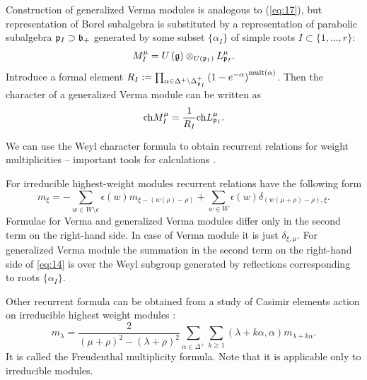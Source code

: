 Construction of generalized Verma modules is analogous to (\ref{eq:17}), but representation of Borel subalgebra is substituted by a representation of parabolic subalgebra $\mathfrak{p}_{I}\supset \mathfrak{b}_{+}$ generated by some subset $\{\alpha_{I}\}$ of simple roots $I\subset \{1,\dots, r\}$:
\begin{equation*}
M_{I}^{\mu}=U\left( \mathfrak{g}\right)\otimes _{U\left( \mathfrak{p}_{I}\right) }L_{\mathfrak{p}_{I}}^{\mu}.
\end{equation*}
Introduce a formal element $R_{I}:=\prod_{\alpha \in \Delta
^{+}\setminus \Delta _{\mathfrak{p}_{I}}^{+}}\left( 1-e^{-\alpha }\right)
^{\mathrm{mult}(\alpha )}$. Then the character of a generalized
Verma module can be written as
\begin{equation}
  \label{eq:18}
  \mathrm{ch}M_{I}^{\mu}=\frac{1}{R_{I}}\mathrm{ch}L_{\mathfrak{p}_{I}}^{\mu }.
\end{equation}



We can use the Weyl character formula to obtain recurrent relations for weight multiplicities -- important tools for calculations \cite{il2010folded,kulish4sfa}. 

For irreducible highest-weight modules recurrent relations have the following form
\begin{equation}
\label{eq:14}
m_{\xi }=-\sum_{w\in W\setminus e}\epsilon (w)m_{\xi
-\left( w(\rho )-\rho \right) }+\sum_{w\in W}\epsilon
(w)\delta _{\left( w(\mu +\rho )-\rho \right) ,\xi }.
\end{equation}
Formulae for Verma and generalized Verma modules differ only in the second term on the right-hand side. In case of Verma module it is just $\delta_{\xi,\mu}$. For generalized Verma module the summation in the second term on the right-hand side of \eqref{eq:14} is over the Weyl subgroup generated by reflections corresponding to roots $\{\alpha_{I}\}$.

Other recurrent formula can be obtained from a study of Casimir
elements action on irreducible highest weight modules
\cite{humphreys1997introduction}:
\begin{equation}
  \label{eq:15}
  m_{\lambda}=\frac{2}{(\mu+\rho)^{2}-(\lambda+\rho)^{2}}\sum_{\alpha\in \Delta^{+}}\sum_{k\geq 1} (\lambda+k\alpha,\alpha)m_{\lambda+k\alpha}.
\end{equation}
It is called the Freudenthal multiplicity formula.
Note that it is applicable only to irreducible modules. 


